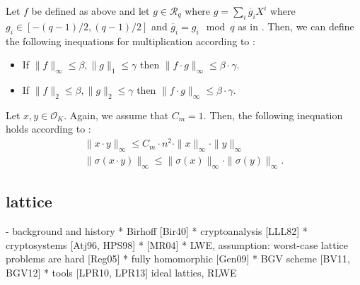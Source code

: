 \documentclass[
  a4paper,  %
  twoside,  %
  bibliography=totoc,
  headsepline,
  cleardoublepage=empty,
  parskip=half,
  draft=false
]{scrbook}
\begin{document}
Let $f$ be defined as above and let $g \in \mathcal{R}_q$ where $g = \sum_i \overline{g}_i X^i$ where $g_i \in \left[-(q-1)/2, (q-1)/2\right]$ and $\overline{g}_i = g_i \mod q$ as in \cite{BDLOP18}. Then, we can define the following inequations for multiplication according to \cite{BDLOP18}:

\begin{itemize}
  \item If $\|f\|_\infty \leq \beta, \|g\|_1 \leq \gamma$ then $\|f \cdot g\|_\infty \leq \beta \cdot \gamma$.
  \item If $\|f\|_2 \leq \beta, \|g\|_2 \leq \gamma$ then $\|f \cdot g\|_\infty \leq \beta \cdot \gamma$.
\end{itemize}

Let $x, y \in \mathcal{O}_K$. Again, we assume that $C_m = 1$. Then, the following inequation holds according to \cite{DPSZ12}:
\begin{align}
  \| x \cdot y \|_\infty \leq C_m \cdot n^2 \cdot \| x \|_\infty \cdot \| y \|_\infty\\
  \| \sigma(x \cdot y) \|_\infty \leq  \| \sigma(x) \|_\infty \cdot \| \sigma(y) \|_\infty.
\end{align}



\subsection{lattice}
- background and history %
  * Birhoff [Bir40]
  * cryptoanalysis [LLL82]
  * cryptosystems [Atj96, HPS98]
  * [MR04]
  * LWE, assumption: worst-case lattice problems are hard [Reg05]
  * fully homomorphic [Gen09]
  * BGV scheme [BV11, BGV12]
  * tools [LPR10, LPR13] ideal latties, RLWE
\end{document}
